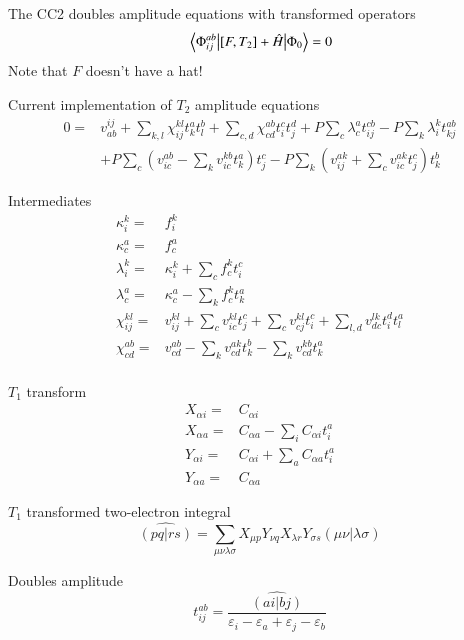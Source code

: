 \documentclass[aip,jcp,reprint,amsmath,amssymb,floatfix,citeautoscript,nofootinbib,onecolumn]{revtex4-2}
\begin{document}
The CC2 doubles amplitude equations with transformed operators
\begin{equation}
    \mel{\Phi^{ab}_{ij}}{\left[F,T_2\right]+\hat{H}}{\Phi_0}=0
\end{equation}
Note that $F$ doesn't have a hat!

Current implementation of $T_2$ amplitude equations
\begin{equation}
    \begin{aligned}
        0=&v^{ij}_{ab}+\sum_{k,l}\chi^{kl}_{ij}t^a_kt^b_l+\sum_{c,d}\chi^{ab}_{cd}t^c_it^d_j+P\sum_c\lambda^a_ct^{cb}_{ij}-P\sum_k\lambda^k_it^{ab}_{kj}\\
        &+P\sum_c\left(v^{ab}_{ic}-\sum_kv^{kb}_{ic}t^a_k\right)t^c_j-P\sum_k\left(v^{ak}_{ij}+\sum_cv^{ak}_{ic}t^c_j\right)t^b_k
    \end{aligned}
\end{equation}

Intermediates
\begin{align}
    \kappa^k_i=&f^k_i\\
    \kappa^a_c=&f^a_c\\
    \lambda^k_i=&\kappa^k_i+\sum_cf^k_ct^c_i\\
    \lambda^a_c=&\kappa^a_c-\sum_kf^k_ct^a_k\\
    \chi^{kl}_{ij}=&v^{kl}_{ij}+\sum_cv^{kl}_{ic}t^c_j+\sum_cv^{kl}_{cj}t^c_i+\sum_{l,d}v^{lk}_{dc}t^d_it^a_l\\
    \chi^{ab}_{cd}=&v^{ab}_{cd}-\sum_kv^{ak}_{cd}t^b_k-\sum_kv^{kb}_{cd}t^a_k\\
\end{align}

$T_1$ transform
\begin{align}
    X_{\alpha i}=&C_{\alpha i}\\
    X_{\alpha a}=&C_{\alpha a}-\sum_iC_{\alpha i}t^a_i\\
    Y_{\alpha i}=&C_{\alpha i}+\sum_aC_{\alpha a}t^a_i\\
    Y_{\alpha a}=&C_{\alpha a}
\end{align}

$T_1$ transformed two-electron integral
\begin{equation}
    \hat{\left(pq|rs\right)}=\sum_{\mu\nu\lambda\sigma}X_{\mu p}Y_{\nu q}X_{\lambda r}Y_{\sigma s}\left(\mu\nu|\lambda\sigma\right)
\end{equation}

Doubles amplitude
\begin{equation}
    t^{ab}_{ij}=\frac{\hat{\left(ai|bj\right)}}{\varepsilon_i-\varepsilon_a+\varepsilon_j-\varepsilon_b}
\end{equation}
\end{document}
